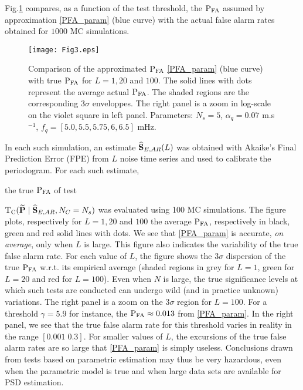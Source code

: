 \documentclass[journal]{IEEEtran}
\begin{document}
 Fig.\ref{Fig3} compares, as a function of the test threshold,  the $\rm P_{FA}$ assumed by approximation \eqref{PFA_param} (blue curve) with the actual false alarm rates obtained for  $1000$ MC simulations.
 \begin{figure}[htb!]  	\centerline{
	 \hspace{-0.2cm} \texttt{[image: Fig3.eps]}}
	\caption{ Comparison of the approximated $\rm P_{FA}$  \eqref{PFA_param} (blue curve) with true $\rm P_{FA}$ for $L=1,20$ and $100$.
	The solid lines with dots represent the average actual $\rm P_{FA}$. The shaded regions are the corresponding  $3\sigma$ enveloppes. The  right panel is a zoom in log-scale on the violet square in left panel.  { Parameters: $N_s = 5$, $\alpha_q = 0.07$ {m.s$^{-1}$}, $f_q =[5.0, 5.5, 5.75, 6, 6.5]$ mHz.}}
	\label{Fig3}
\end{figure}

 In each such simulation, an estimate $\widehat{\bf S}_{E,AR}(L)$ was obtained  with Akaike's Final Prediction Error (FPE)   \cite{Akaike_1969}  from $L$ noise time series and used to calibrate the periodogram. 
      For each such estimate, 
  
  the true $\rm P_{FA}$ of test 
  
  ${\rm T_C}(  {\bf \widetilde{\bf P}}\;|\;{ \widehat{\bf S}_{E,AR}},N_C=N_s)$
   was evaluated using 100  MC simulations. The figure plots, respectively for $L=1, 20$ and $100$ the average  $\rm P_{FA}$,  respectively in black, green and red solid lines with dots. We see that \eqref{PFA_param} is accurate, \textit{on average}, only when $L$ is large.
This figure also indicates the variability of the true false alarm rate. For each value of $L$, the figure shows the $3\sigma$ dispersion of the true  $\rm P_{FA}$  w.r.t. its empirical average  (shaded regions in grey for $L=1$, green for $L=20$ and red for $L=100$). Even when $N$ is large, the true
significance levels at which such  tests are conducted can undergo wild (and in practice unknown) variations. The right panel is a zoom on the $3\sigma$ region for $L=100$.
{
For a threshold $\gamma =5.9$ for instance, the $\rm P_{FA}\approx 0.013$ from \eqref{PFA_param}. In the right panel, we see
that  the true false alarm rate for this threshold varies in reality  in the range $[0.001 \; 0.3]$.}
For smaller values of $L$, the excursions of the true false alarm rates are so large that \eqref{PFA_param} is simply useless. Conclusions drawn from tests based on  parametric estimation may thus be very hazardous, even
{ when the parametric model is true and }
 when large  data sets are available for PSD estimation. 
\end{document}
